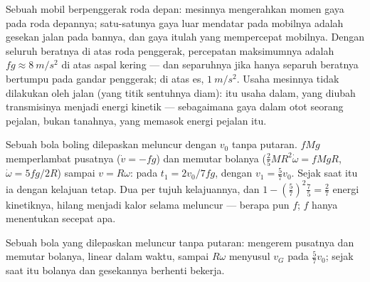 \begin{example}\label{ex:b2:rigid-body-mechanics:car}
Sebuah mobil berpenggerak roda depan: mesinnya mengerahkan momen gaya
pada roda depannya; satu-satunya gaya luar mendatar pada mobilnya adalah
gesekan jalan pada bannya, dan gaya itulah yang mempercepat mobilnya.
Dengan seluruh beratnya di atas roda penggerak, percepatan maksimumnya
adalah $fg \approx \qty{8}{m/s^2}$ di atas aspal kering --- dan
separuhnya jika hanya separuh beratnya bertumpu pada gandar penggerak;
di atas es, $\qty{1}{m/s^2}$. Usaha mesinnya tidak dilakukan oleh jalan
(yang titik sentuhnya diam): itu usaha dalam, yang diubah transmisinya
menjadi energi kinetik --- sebagaimana gaya dalam otot seorang pejalan,
bukan tanahnya, yang memasok energi pejalan itu.
\end{example}

\begin{example}\label{ex:b2:rigid-body-mechanics:bowling}
Sebuah bola boling dilepaskan meluncur dengan $v_0$ tanpa putaran.
 $fMg$ memperlambat pusatnya ($\dot v = -fg$) dan memutar
bolanya ($\tfrac25MR^2\dot\omega = fMgR$, $\dot\omega = 5fg/2R$) sampai
$v = R\omega$: pada $t_1 = 2v_0/7fg$, dengan $v_1 = \tfrac57v_0$. Sejak
saat itu ia  dengan kelajuan tetap. Dua per
tujuh kelajuannya, dan $1 - (\tfrac57)^2\tfrac75 = \tfrac27$ energi
kinetiknya, hilang menjadi kalor selama meluncur --- berapa pun $f$;
$f$ hanya menentukan secepat apa.
\end{example}

\begin{omfigure}

{\small Sebuah bola yang dilepaskan meluncur tanpa putaran:  mengerem pusatnya dan memutar bolanya, linear dalam waktu,
sampai $R\omega$ menyusul $v_G$ pada $\tfrac57v_0$; sejak saat itu
bolanya  dan gesekannya berhenti bekerja.}
\end{omfigure}

